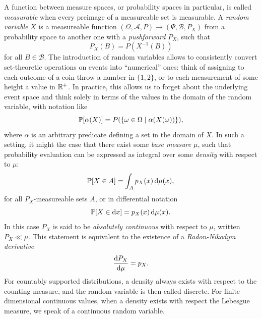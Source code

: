 A function between measure spaces, or probability spaces in particular, is called \emph{measurable}
when every preimage of a measureable set is measurable.  A \emph{random variable} \(X\) is a
measureable function \((\Omega, \mathcal{A}, P) \to (\Psi, \mathcal{B}, P_X)\) from a probability
space to another one with a \emph{pushforward} \(P_X\), such that
\begin{equation}
  \label{eq:pushforward}
  P_X(B) = P(X^{-1}(B))
\end{equation}
for all \(B \in \mathcal{B}\).  The introduction of random variables allows to consistently convert
set-theoretic operations on events into \enquote{numerical} ones: think of assigning to each outcome
of a coin throw a number in \(\{1, 2\}\), or to each measurement of some height a value in
\(\mathbb{R}^{+}\).  In practice, this allows us to forget about the underlying event space and think
solely in terms of the values in the domain of the random variable, with notation like
\begin{equation}
  \label{eq:prob-notation}
  \Prob{\alpha(X)} = P(\{\omega \in \Omega \mid \alpha(X(\omega))\}),
\end{equation}
where \(\alpha\) is an arbitrary predicate defining a set in the domain of \(X\).  In such a
setting, it might the case that there exist some \emph{base measure} \(\mu\), such that probability
evaluation can be expressed as integral over some \emph{density} with respect to \(\mu\):
\begin{equation}
  \label{eq:measure-integral}
  \Prob{X \in A} = \int_{A} \prob[X]{x} \dif\mu(x),
\end{equation}
for all \(P_X\)-measureable sets \(A\), or in differential notation
\begin{equation}
  \label{eq:measure-differential}
  \Prob{X \in \dif x} = \prob[X]{x} \dif\mu(x).
\end{equation}
In this case \(P_X\) is said to be \emph{absolutely continuous} with respect to \(\mu\), written
\(P_X \ll \mu\).  This statement is equivalent to the existence of a \emph{Radon-Nikodym derivative}
\begin{equation}
  \label{eq:radon-nikodym}
  \frac{\dif P_{X}}{\dif \mu} = p_{X}.
\end{equation}
For countably supported distributions, a density always exists with respect to the counting measure,
and the random variable is then called discrete.  For finite-dimensional continuous values, when a
density exists with respect the Lebesgue measure, we speak of a continuous random variable.




